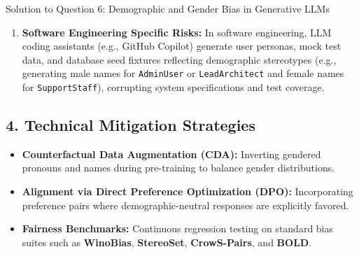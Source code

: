 \documentclass[11pt,a4paper]{article}
\begin{document}
\begin{solutionbox}{Solution to Question 6: Demographic and Gender Bias in Generative LLMs}
\begin{enumerate}[label=\textbf{(\alph*)},leftmargin=1.5em,itemsep=3pt]
    \item \textbf{Software Engineering Specific Risks:}
    In software engineering, LLM coding assistants (e.g., GitHub Copilot) generate user personas, mock test data, and database seed fixtures reflecting demographic stereotypes (e.g., generating male names for \texttt{AdminUser} or \texttt{LeadArchitect} and female names for \texttt{SupportStaff}), corrupting system specifications and test coverage.
\end{enumerate}

\subsection*{4. Technical Mitigation Strategies}
\begin{itemize}[leftmargin=1.5em,itemsep=1pt]
    \item \textbf{Counterfactual Data Augmentation (CDA):} Inverting gendered pronouns and names during pre-training to balance gender distributions.
    \item \textbf{Alignment via Direct Preference Optimization (DPO):} Incorporating preference pairs where demographic-neutral responses are explicitly favored.
    \item \textbf{Fairness Benchmarks:} Continuous regression testing on standard bias suites such as \textbf{WinoBias}, \textbf{StereoSet}, \textbf{CrowS-Pairs}, and \textbf{BOLD}.
\end{itemize}
\end{solutionbox}

\vspace{0.4cm}
\end{document}
